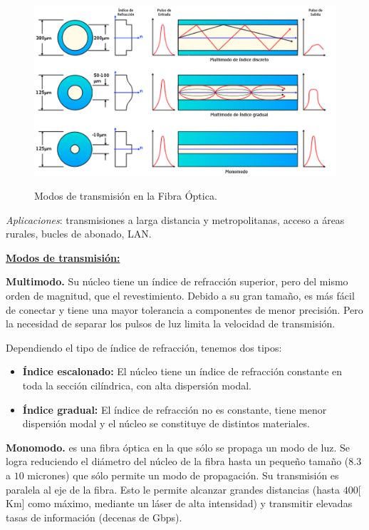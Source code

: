 \documentclass[10pt,a4paper]{article}
\begin{document}
\begin{figure}[ht!]
  \caption{Modos de transmisión en la Fibra Óptica.}
  \label{fig:fibra_optica_modos}  
  \centering
  \hbox{
	\includegraphics[width=\textwidth-\fboxrule-\fboxrule]{imgs/fibra_optica_modos.png}}
\end{figure}

\vspace{10pt}

\textit{Aplicaciones}: transmisiones a larga distancia y metropolitanas, acceso a áreas rurales, bucles de abonado, LAN.

\underline{\textbf{Modos de transmisión:}}
\begin{description}
\item \textbf{Multimodo.} Su núcleo tiene un índice de refracción superior, pero del mismo orden de magnitud, que el revestimiento. Debido a su gran tamaño, es más fácil de conectar y tiene una mayor tolerancia a componentes de menor precisión. Pero la necesidad de separar los pulsos de luz limita la velocidad de transmisión.

Dependiendo el tipo de índice de refracción, tenemos dos tipos:
\begin{itemize}
\item \textbf{Índice escalonado:} El núcleo tiene un índice de refracción constante en toda la sección cilíndrica, con alta dispersión modal.
\item \textbf{Índice gradual:} El índice de refracción no es constante, tiene menor dispersión modal y el núcleo se constituye de distintos materiales.
\end{itemize}
\item \textbf{Monomodo.} es una fibra óptica en la que sólo se propaga un modo de luz. Se logra reduciendo el diámetro del núcleo de la fibra hasta un pequeño tamaño ($8.3$ a $10$ micrones) que sólo permite un modo de propagación. Su transmisión es paralela al eje de la fibra. Esto le permite alcanzar grandes distancias (hasta $400 [$Km$]$ como máximo, mediante un láser de alta intensidad) y transmitir elevadas tasas de información (decenas de Gbps).
\end{description}
\end{document}
